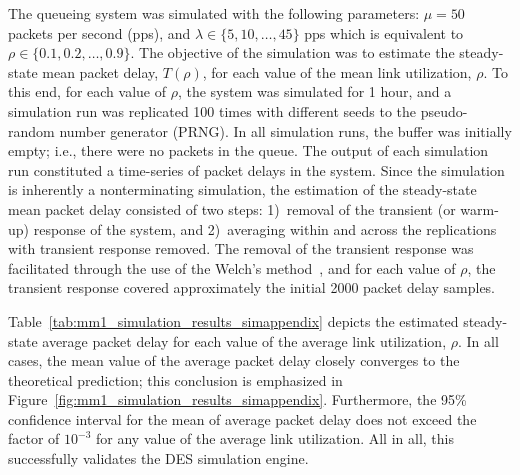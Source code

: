 The queueing system was simulated with the following parameters: $\mu=50$ packets per second (pps), and $\lambda\in\{5,10,\ldots,45\}$ pps which is equivalent to $\rho\in\{0.1,0.2,\ldots,0.9\}$. The objective of the simulation was to estimate the steady-state mean packet delay, $T(\rho)$, for each value of the mean link utilization, $\rho$. To this end, for each value of $\rho$, the system was simulated for 1 hour, and a simulation run was replicated 100 times with different seeds to the pseudo-random number generator (PRNG). In all simulation runs, the buffer was initially empty; i.e., there were no packets in the queue. The output of each simulation run constituted a time-series of packet delays in the system. Since the simulation is inherently a nonterminating simulation, the estimation of the steady-state mean packet delay consisted of two steps: 1)~removal of the transient (or warm-up) response of the system, and 2)~averaging within and across the replications with transient response removed. The removal of the transient response was facilitated through the use of the Welch's method~\cite{LawChapter92007}, and for each value of $\rho$, the transient response covered approximately the initial 2000 packet delay samples.

Table~\ref{tab:mm1_simulation_results_simappendix} depicts the estimated steady-state average packet delay for each value of the average link utilization, $\rho$. In all cases, the mean value of the average packet delay closely converges to the theoretical prediction; this conclusion is emphasized in Figure~\ref{fig:mm1_simulation_results_simappendix}. Furthermore, the 95\% confidence interval for the mean of average packet delay does not exceed the factor of $10^{-3}$ for any value of the average link utilization. All in all, this successfully validates the DES simulation engine.

